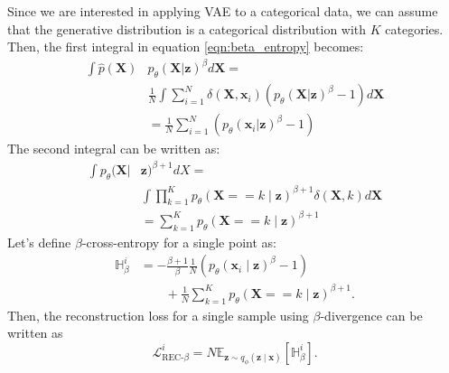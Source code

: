 \documentclass{article}
\def\bx{\mathbf{x}}
\def\bX{\mathbf{X}}
\def\bz{\mathbf{z}}
\theoremstyle{plain}
\theoremstyle{definition}
\begin{document}
Since we are interested in applying VAE to a categorical data, we can assume  that the generative distribution is a categorical distribution with $K$ categories. Then, the first integral in equation \ref{eqn:beta_entropy} becomes:
\begin{equation}
\begin{split}
\int \hat{p}(\bX) &  p_{\theta}(\bX | \bz)^{\beta }d \bX = \\
& \frac{1}{N} \int \sum_{i=1}^N \delta(\bX, \bx_i) \left( p_{\theta}(\bX | \bz)^{\beta} - 1 \right) d \bX   \\
&= \frac{1}{N} \sum_{i=1}^N  \left( p_{\theta}(\bx_i | \bz)^{\beta} - 1 \right)
\end{split}
\end{equation}
The second integral can be written as:
\begin{equation}
\begin{split}
\int p_{\theta}(\bX | & \bz)^{\beta + 1} dX = \\
& \int \prod_{k=1}^K p_{\theta}( \bX == k \mid \bz)^{\beta + 1} \delta (\bX, k) d \bX  \\
&= \sum_{k=1}^K p_{\theta}(\bX == k \mid \bz)^{\beta + 1}
\end{split}
\end{equation}
Let's define $\beta$-cross-entropy for a single point as:
\begin{equation}
\begin{split}
\mathbb{H}_{\beta}^i &= - \frac{\beta + 1}{\beta} \frac{1}{N} \left( p_{\theta}(\bx_i \mid \bz)^{\beta} - 1 \right) \\
& \quad \quad + \frac{1}{N} \sum_{k=1}^K p_{\theta}(\bX == k \mid \bz)^{\beta + 1}.
\end{split}
\end{equation}
Then, the reconstruction loss for a single sample using $\beta$-divergence can be written as
\begin{equation}
\mathcal{L}_{\textrm{REC-} \beta}^i = N \mathbb{E}_{\bz \sim q_{\phi}(\bz \mid \bx)} \left [ \mathbb{H}_{\beta}^i \right ].
\label{eqn:L_rec_beta}
\end{equation}
\end{document}
